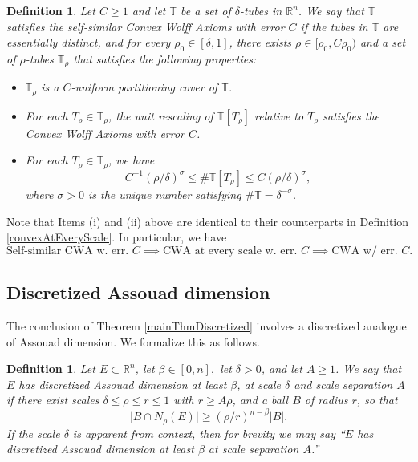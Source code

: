 \documentclass[letterpaper, reqno,11pt]{article}
\numberwithin{equation}{section}
\newcommand{\RR}{\mathbb{R}}
\newcommand{\tubes}{\mathbb{T}}
\numberwithin{thm}{section}
\newtheorem{defn}[thm]{Definition}
\theoremstyle{remark}
\begin{document}
\begin{defn}\label{selfSimilarWolff}
Let $C\geq 1$ and let $\tubes$ be a set of $\delta$-tubes in $\RR^n$. We say that $\tubes$ satisfies the \emph{self-similar Convex Wolff Axioms with error $C$} if the tubes in $\tubes$ are essentially distinct, and for every $\rho_0\in [\delta,1]$, there exists $\rho\in [\rho_0, C\rho_0)$ and a set of $\rho$-tubes $\tubes_\rho$ that satisfies the following properties:
\begin{itemize}
	\item[(i)] $\tubes_\rho$ is a $C$-uniform partitioning cover of $\tubes$.
	\item[(ii)] For each $T_\rho\in\tubes_\rho$, the unit rescaling of $\tubes[T_\rho]$ relative to $T_\rho$ satisfies the Convex Wolff Axioms with error $C$.
	\item[(iii)] For each $T_\rho\in\tubes_\rho$, we have 
\begin{equation}\label{selfSimilarNumberTubes}
C^{-1}(\rho/\delta)^{\sigma}\leq \#\tubes[T_\rho]\leq C(\rho/\delta)^{\sigma},
\end{equation}
where $\sigma>0$ is the unique number satisfying $\#\tubes=\delta^{-\sigma}$.
\end{itemize}


\end{defn}
Note that Items (i) and (ii) above are identical to their counterparts in Definition \ref{convexAtEveryScale}. In particular, we have
\begin{equation}\label{CWAImplication}
\textrm{Self-similar CWA w.~err.~$C$} \implies \textrm{CWA at every scale w.~err.~$C$}\implies \textrm{CWA w/~err.~$C$}.
\end{equation}



\subsection{Discretized Assouad dimension}
The conclusion of Theorem \ref{mainThmDiscretized} involves a discretized analogue of Assouad dimension. We formalize this as follows.

\begin{defn}
Let $E\subset\RR^n$, let $\beta\in[0,n],$ let $\delta>0$, and let $A\geq 1$. We say that $E$ has \emph{discretized Assouad dimension at least $\beta$, at scale $\delta$ and scale separation $A$} if there exist scales $\delta\leq\rho\leq r\leq 1$ with $r\geq A\rho$, and a ball $B$ of radius $r$, so that
\[
\big| B \cap N_{\rho}(E)\big| \geq (\rho/r)^{n-\beta} |B|. 
\]
If the scale $\delta$ is apparent from context, then for brevity we may say ``$E$ has discretized Assouad dimension at least $\beta$ at scale separation $A$.''
\end{defn}
\end{document}
